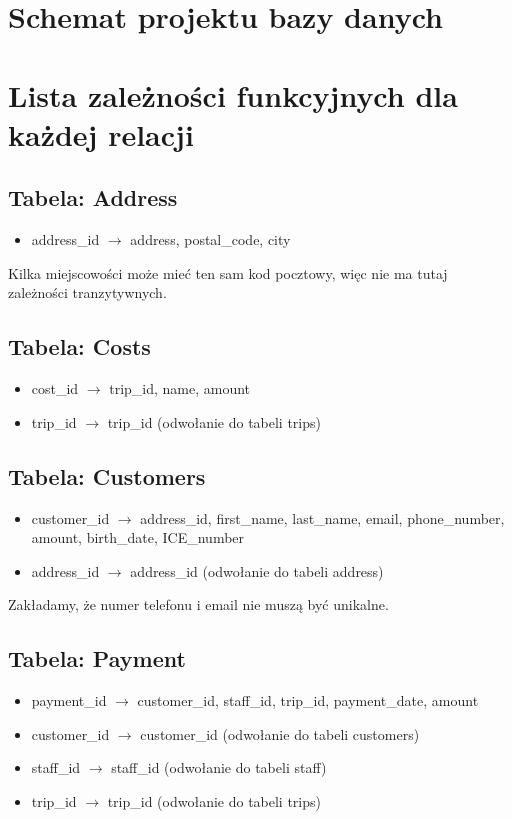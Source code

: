 \documentclass{article}
\begin{document}
\section{Schemat projektu bazy danych}

\newpage

\section{Lista zależności funkcyjnych dla każdej relacji}

\subsection{Tabela: Address}
\begin{itemize}
    \item address\_id $\rightarrow$ address, postal\_code, city
\end{itemize}
Kilka miejscowości może mieć ten sam kod pocztowy, więc nie ma tutaj zależności tranzytywnych.
\subsection{Tabela: Costs}
\begin{itemize}
    \item cost\_id $\rightarrow$ trip\_id, name, amount
    \item trip\_id $\rightarrow$ trip\_id (odwołanie do tabeli trips)
\end{itemize}
\subsection{Tabela: Customers}
\begin{itemize}
    \item customer\_id $\rightarrow$ address\_id, first\_name, last\_name, email, phone\_number, amount, birth\_date, ICE\_number
    \item address\_id $\rightarrow$ address\_id (odwołanie do tabeli address)
\end{itemize}
Zakładamy, że numer telefonu i email nie muszą być unikalne.
\subsection{Tabela: Payment}
\begin{itemize}
    \item payment\_id $\rightarrow$ customer\_id, staff\_id, trip\_id, payment\_date, amount
    \item customer\_id $\rightarrow$ customer\_id (odwołanie do tabeli customers)
    \item staff\_id $\rightarrow$ staff\_id (odwołanie do tabeli staff)
    \item trip\_id $\rightarrow$ trip\_id (odwołanie do tabeli trips)
\end{itemize}
\end{document}
